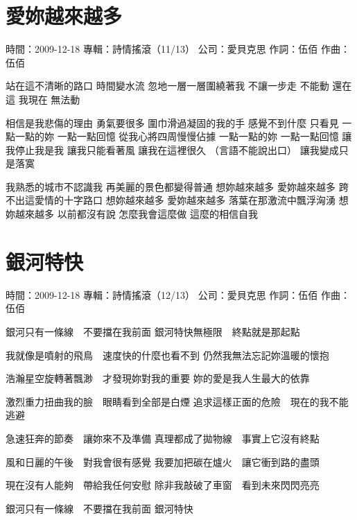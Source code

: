 \documentclass[UTF8,a4paper,oneside,twocolumn,12pt]{ctexbook}
\newcommand{\infopair}[2]{\textbullet #1：#2}
\newcommand{\zc}[1][伍佰]{\infopair{作詞}{#1}}
\newcommand{\zq}[1][伍佰]{\infopair{作曲}{#1}}
\newcommand{\zj}[1]{\infopair{專輯}{#1}}
\newcommand{\sj}[1]{\infopair{時間}{#1}}
\newcommand{\gs}[1]{\infopair{公司}{#1}}
\newenvironment{info}{\begin{flushleft}\kaishu
	}
	{\end{flushleft}\normalsize\yahei\par}
\newenvironment{lyric}{
	}
{}
\begin{document}
\section{愛妳越來越多}
\begin{info}
	\sj{2009-12-18}
	\zj{詩情搖滾（11/13）}
	\gs{愛貝克思}
	\zc
	\zq
\end{info}
\begin{lyric}
	站在這不清晰的路口 時間變水流
	忽地一層一層圍繞著我 不讓一步走
	不能動 還在這 我現在 無法動

	相信是我悲傷的理由 勇氣要很多
	圍巾滑過凝固的我的手 感覺不到什麼
	只看見 一點一點的妳 一點一點回憶
	從我心將四周慢慢佔據
	一點一點的妳 一點一點回憶
	讓我停止我是我 讓我只能看著風
	讓我在這裡很久 （言語不能說出口） 讓我變成只是落寞

	我熟悉的城市不認識我
	再美麗的景色都變得普通
	想妳越來越多 愛妳越來越多
	跨不出這愛情的十字路口
	想妳越來越多 愛妳越來越多
	落葉在那激流中飄浮洶湧
	想妳越來越多 以前都沒有說
	怎麼我會這麼做 這麼的相信自我
\end{lyric}

\section{銀河特快}
\begin{info}
	\sj{2009-12-18}
	\zj{詩情搖滾（12/13）}
	\gs{愛貝克思}
	\zc
	\zq
\end{info}
\begin{lyric}
	銀河只有一條線　不要擋在我前面
	銀河特快無極限　終點就是那起點

	我就像是噴射的飛鳥　速度快的什麼也看不到
	仍然我無法忘記妳溫暖的懷抱

	浩瀚星空旋轉著飄渺　才發現妳對我的重要
	妳的愛是我人生最大的依靠

	激烈重力扭曲我的臉　眼睛看到全部是白煙
	追求這樣正面的危險　現在的我不能逃避

	急速狂奔的節奏　讓妳來不及準備
	真理都成了拋物線　事實上它沒有終點

	風和日麗的午後　對我會很有感覺
	我要加把碳在爐火　讓它衝到路的盡頭

	現在沒有人能夠　帶給我任何安慰
	除非我敲破了車窗　看到未來閃閃亮亮

	銀河只有一條線　不要擋在我前面 銀河特快
\end{lyric}
\end{document}
